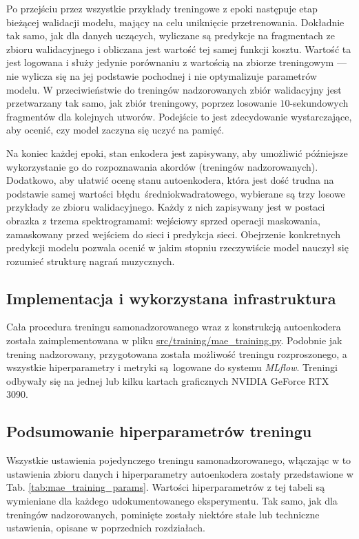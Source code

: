 Po przejściu przez wszystkie przykłady treningowe z epoki następuje etap bieżącej walidacji modelu, mający na celu uniknięcie przetrenowania. Dokładnie tak samo, jak dla danych uczących, wyliczane są predykcje na fragmentach ze zbioru walidacyjnego i obliczana jest wartość tej samej funkcji kosztu.  Wartość ta jest logowana i służy jedynie porównaniu z wartością na zbiorze treningowym --- nie wylicza się na jej podstawie pochodnej i nie optymalizuje parametrów modelu. W przeciwieństwie do treningów nadzorowanych zbiór walidacyjny jest przetwarzany tak samo, jak zbiór treningowy, poprzez losowanie $10$-sekundowych fragmentów dla kolejnych utworów. Podejście to jest zdecydowanie wystarczające, aby ocenić, czy model zaczyna się uczyć na pamięć.

Na koniec każdej epoki, stan enkodera jest zapisywany, aby umożliwić późniejsze wykorzystanie go do rozpoznawania akordów (treningów nadzorowanych). Dodatkowo, aby ułatwić ocenę stanu autoenkodera, która jest dość trudna na podstawie samej wartości błędu średniokwadratowego, wybierane są trzy losowe przykłady ze zbioru walidacyjnego. Każdy z nich zapisywany jest w postaci obrazka z trzema spektrogramami: wejściowy sprzed operacji maskowania, zamaskowany przed wejściem do sieci i predykcja sieci. Obejrzenie konkretnych predykcji modelu pozwala ocenić w jakim stopniu rzeczywiście model nauczył się rozumieć strukturę nagrań muzycznych.

\subsection{Implementacja i wykorzystana infrastruktura}

Cała procedura treningu samonadzorowanego wraz z konstrukcją autoenkodera została zaimplementowana w pliku \url{src/training/mae_training.py}. Podobnie jak trening nadzorowany, przygotowana została możliwość treningu rozproszonego, a wszystkie hiperparametry i metryki są logowane do systemu \emph{MLflow}. Treningi odbywały się na jednej lub kilku kartach graficznych NVIDIA GeForce RTX 3090.

\subsection{Podsumowanie hiperparametrów treningu}

Wszystkie ustawienia pojedynczego treningu samonadzorowanego, włączając w to ustawienia zbioru danych i hiperparametry autoenkodera zostały przedstawione w Tab. \ref{tab:mae_training_params}.  Wartości hiperparametrów z tej tabeli są wymieniane dla każdego udokumentowanego eksperymentu. Tak samo, jak dla treningów nadzorowanych, pominięte zostały niektóre stałe lub techniczne ustawienia, opisane w poprzednich rozdziałach. 

